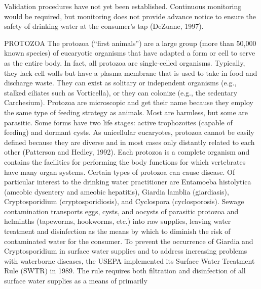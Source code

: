 \documentclass{article}
\begin{document}
Validation procedures have not yet been established. Continuous
monitoring would be required, but monitoring does not provide advance
notice to ensure the safety of drinking water at the consumer's tap
(DeZuane, 1997).

PROTOZOA The protozoa (``first animals'') are a large group (more than
50,000 known species) of eucaryotic organisms that have adapted a form
or cell to serve as the entire body. In fact, all protozoa are
single-celled organisms. Typically, they lack cell walls but have a
plasma membrane that is used to take in food and discharge waste. They
can exist as solitary or independent organisms (e.g., stalked ciliates
such as Vorticella), or they can colonize (e.g., the sedentary
Carchesium). Protozoa are microscopic and get their name because they
employ the same type of feeding strategy as animals. Most are harmless,
but some are parasitic. Some forms have two life stages: active
trophozoites (capable of feeding) and dormant cysts. As unicellular
eucaryotes, protozoa cannot be easily defined because they are diverse
and in most cases only distantly related to each other (Patterson and
Hedley, 1992). Each protozoa is a complete organism and contains the
facilities for performing the body functions for which vertebrates have
many organ systems. Certain types of protozoa can cause disease. Of
particular interest to the drinking water practitioner are Entamoeba
histolytica (ameobic dysentery and ameobic hepatitis), Giardia lamblia
(giardiasis), Cryptosporidium (cryptosporidiosis), and Cyclospora
(cyclosporosis). Sewage contamination transports eggs, cysts, and
oocysts of parasitic protozoa and helminths (tapeworms, hookworms, etc.)
into raw supplies, leaving water treatment and disinfection as the means
by which to diminish the risk of contaminated water for the consumer. To
prevent the occurrence of Giardia and Cryptosporidium in surface water
supplies and to address increasing problems with waterborne diseases,
the USEPA implemented its Surface Water Treatment Rule (SWTR) in 1989.
The rule requires both filtration and disinfection of all surface water
supplies as a means of primarily
\end{document}
